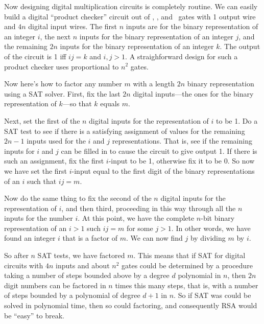 Now designing digital multiplication circuits is completely routine.
We can easily build a digital ``product checker'' circuit out of
\QAND, \QOR, and \QNOT\ gates with 1 output wire and $4n$ digital
input wires.  The first $n$ inputs are for the binary representation
of an integer $i$, the next $n$ inputs for the binary representation
of an integer $j$, and the remaining $2n$ inputs for the binary
representation of an integer $k$.  The output of the circuit is 1 iff
$ij=k$ and $i,j>1$.  A straighforward design for such a product
checker uses proportional to $n^2$ gates.

Now here's how to factor any number $m$ with a length $2n$ binary
representation using a SAT solver.  First, fix the last $2n$ digital
inputs---the ones for the binary representation of $k$---so that $k$
equals $m$.

Next, set the first of the $n$ digital inputs for the representation
of $i$ to be 1.  Do a SAT test to see if there is a satisfying
assignment of values for the remaining $2n-1$ inputs used for the $i$
and $j$ representations.  That is, see if the remaining inputs for $i$
and $j$ can be filled in to cause the circuit to give output 1.  If
there is such an assignment, fix the first $i$-input to be 1,
otherwise fix it to be 0.  So now we have set the first $i$-input
equal to the first digit of the binary representations of an $i$ such
that $ij=m$.

Now do the same thing to fix the second of the $n$ digital inputs for
the representation of $i$, and then third, proceeding in this way
through all the $n$ inputs for the number $i$.  At this point, we have
the complete $n$-bit binary representation of an $i>1$ such $ij=m$ for
some $j>1$.  In other words, we have found an integer $i$ that is a
factor of $m$.  We can now find $j$ by dividing $m$ by $i$.

So after $n$ SAT tests, we have factored $m$.  This means that if SAT
for digital circuits with $4n$ inputs and about $n^2$ gates could be
determined by a procedure taking a number of steps bounded above by a
degree $d$ polynomial in $n$, then $2n$ digit numbers can be factored
in $n$ times this many steps, that is, with a number of steps bounded
by a polynomial of degree $d+1$ in $n$.  So if SAT was could be solved
in polynomial time, then so could factoring, and consequently RSA
would be ``easy'' to break.

\begin{editingnotes}
\end{editingnotes}

